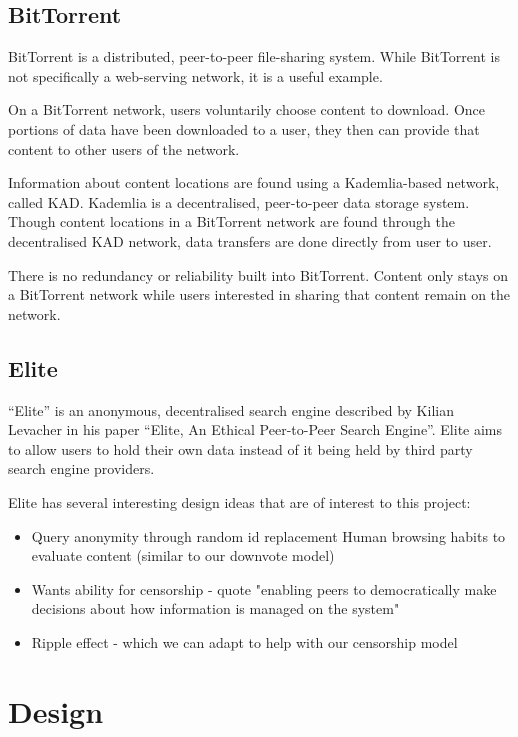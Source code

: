 \documentclass{article}
\begin{document}
\subsection{BitTorrent}

BitTorrent is a distributed, peer-to-peer file-sharing system. While BitTorrent is not specifically a web-serving network, it is a useful example.

On a BitTorrent network, users voluntarily choose content to download. Once portions of data have been downloaded to a user, they then can provide that content to other users of the network.

Information about content locations are found using a Kademlia-based network, called KAD. Kademlia is a decentralised, peer-to-peer data storage system. Though content locations in a BitTorrent network are found through the decentralised KAD network, data transfers are done directly from user to user.

There is no redundancy or reliability built into BitTorrent. Content only stays on a BitTorrent network while users interested in sharing that content remain on the network.

\subsection{Elite}

“Elite” is an anonymous, decentralised search engine described by Kilian Levacher in his paper “Elite, An Ethical Peer-to-Peer Search Engine”. Elite aims to allow users to hold their own data instead of it being held by third party search engine providers.

Elite has several interesting design ideas that are of interest to this project:
\begin{itemize}
    \item{Query anonymity through random id replacement
Human browsing habits to evaluate content (similar to our downvote model)}
    \item{Wants ability for censorship - quote "enabling peers to democratically make decisions about how information is managed on the system"}
    \item{Ripple effect - which we can adapt to help with our censorship model}
\end{itemize}

\section{Design}
\end{document}
